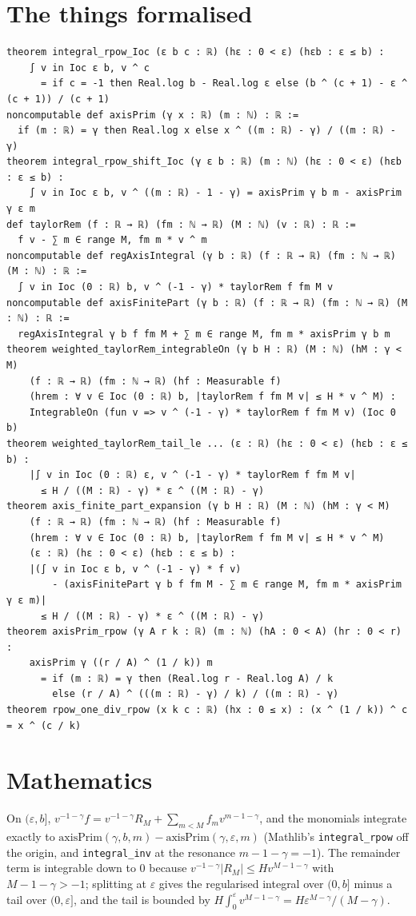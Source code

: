 \documentclass[11pt]{article}
\begin{document}
\section{The things formalised}
{\small
\begin{verbatim}
theorem integral_rpow_Ioc (ε b c : ℝ) (hε : 0 < ε) (hεb : ε ≤ b) :
    ∫ v in Ioc ε b, v ^ c
      = if c = -1 then Real.log b - Real.log ε else (b ^ (c + 1) - ε ^ (c + 1)) / (c + 1)
noncomputable def axisPrim (γ x : ℝ) (m : ℕ) : ℝ :=
  if (m : ℝ) = γ then Real.log x else x ^ ((m : ℝ) - γ) / ((m : ℝ) - γ)
theorem integral_rpow_shift_Ioc (γ ε b : ℝ) (m : ℕ) (hε : 0 < ε) (hεb : ε ≤ b) :
    ∫ v in Ioc ε b, v ^ ((m : ℝ) - 1 - γ) = axisPrim γ b m - axisPrim γ ε m
def taylorRem (f : ℝ → ℝ) (fm : ℕ → ℝ) (M : ℕ) (v : ℝ) : ℝ :=
  f v - ∑ m ∈ range M, fm m * v ^ m
noncomputable def regAxisIntegral (γ b : ℝ) (f : ℝ → ℝ) (fm : ℕ → ℝ) (M : ℕ) : ℝ :=
  ∫ v in Ioc (0 : ℝ) b, v ^ (-1 - γ) * taylorRem f fm M v
noncomputable def axisFinitePart (γ b : ℝ) (f : ℝ → ℝ) (fm : ℕ → ℝ) (M : ℕ) : ℝ :=
  regAxisIntegral γ b f fm M + ∑ m ∈ range M, fm m * axisPrim γ b m
theorem weighted_taylorRem_integrableOn (γ b H : ℝ) (M : ℕ) (hM : γ < M)
    (f : ℝ → ℝ) (fm : ℕ → ℝ) (hf : Measurable f)
    (hrem : ∀ v ∈ Ioc (0 : ℝ) b, |taylorRem f fm M v| ≤ H * v ^ M) :
    IntegrableOn (fun v => v ^ (-1 - γ) * taylorRem f fm M v) (Ioc 0 b)
theorem weighted_taylorRem_tail_le ... (ε : ℝ) (hε : 0 < ε) (hεb : ε ≤ b) :
    |∫ v in Ioc (0 : ℝ) ε, v ^ (-1 - γ) * taylorRem f fm M v|
      ≤ H / ((M : ℝ) - γ) * ε ^ ((M : ℝ) - γ)
theorem axis_finite_part_expansion (γ b H : ℝ) (M : ℕ) (hM : γ < M)
    (f : ℝ → ℝ) (fm : ℕ → ℝ) (hf : Measurable f)
    (hrem : ∀ v ∈ Ioc (0 : ℝ) b, |taylorRem f fm M v| ≤ H * v ^ M)
    (ε : ℝ) (hε : 0 < ε) (hεb : ε ≤ b) :
    |(∫ v in Ioc ε b, v ^ (-1 - γ) * f v)
        - (axisFinitePart γ b f fm M - ∑ m ∈ range M, fm m * axisPrim γ ε m)|
      ≤ H / ((M : ℝ) - γ) * ε ^ ((M : ℝ) - γ)
theorem axisPrim_rpow (γ A r k : ℝ) (m : ℕ) (hA : 0 < A) (hr : 0 < r) :
    axisPrim γ ((r / A) ^ (1 / k)) m
      = if (m : ℝ) = γ then (Real.log r - Real.log A) / k
        else (r / A) ^ (((m : ℝ) - γ) / k) / ((m : ℝ) - γ)
theorem rpow_one_div_rpow (x k c : ℝ) (hx : 0 ≤ x) : (x ^ (1 / k)) ^ c = x ^ (c / k)
\end{verbatim}
}

\section{Mathematics}

On $(\varepsilon,b]$, $v^{-1-\gamma}f=v^{-1-\gamma}R_M+\sum_{m<M}f_mv^{m-1-\gamma}$, and the
monomials integrate exactly to $\mathrm{axisPrim}(\gamma,b,m)-\mathrm{axisPrim}(\gamma,\varepsilon,m)$
(Mathlib's \texttt{integral\_rpow} off the origin, and \texttt{integral\_inv} at the resonance
$m-1-\gamma=-1$). The remainder term is integrable down to $0$ because
$v^{-1-\gamma}|R_M|\le Hv^{M-1-\gamma}$ with $M-1-\gamma>-1$; splitting at $\varepsilon$ gives the
regularised integral over $(0,b]$ minus a tail over $(0,\varepsilon]$, and the tail is bounded by
$H\int_0^\varepsilon v^{M-1-\gamma}=H\varepsilon^{M-\gamma}/(M-\gamma)$.
\end{document}
